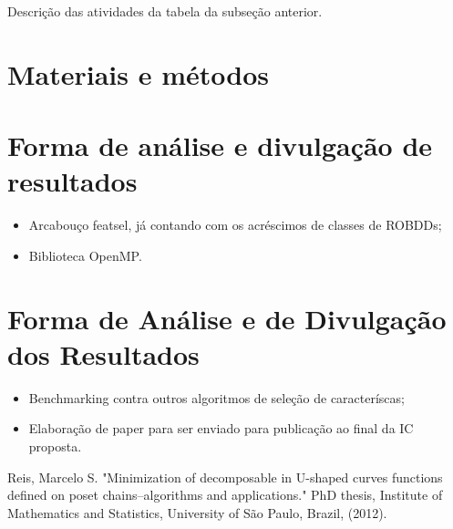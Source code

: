 \documentclass[12pt]{article}
\begin{document}
Descrição das atividades da tabela da subseção anterior.

\section{Materiais e métodos}

\section{Forma de análise e divulgação de resultados}

\begin{itemize}
\item Arcabouço featsel, já contando com os acréscimos de classes de ROBDDs;

\item Biblioteca OpenMP.
\end{itemize}

\section{Forma de Análise e de Divulgação dos Resultados}

\begin{itemize}
\item Benchmarking contra outros algoritmos de seleção de caracteríscas;

\item Elaboração de paper para ser enviado para publicação ao final da IC proposta.
\end{itemize}

\newpage
\begin{thebibliography}{}
    Reis, Marcelo S. "Minimization of decomposable in U-shaped curves 
    functions defined on poset chains–algorithms and applications."
    PhD thesis, Institute of Mathematics and Statistics, University of
    São Paulo, Brazil, (2012).


\end{thebibliography}
\end{document}
